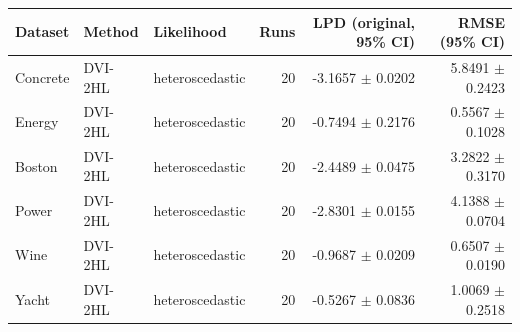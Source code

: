 \begin{tabular}{lllrrr}
\toprule
Dataset & Method & Likelihood & Runs & LPD (original, 95\% CI) & RMSE (95\% CI) \\
\midrule
Concrete & DVI-2HL & heteroscedastic & 20 & -3.1657 $\pm$ 0.0202 & 5.8491 $\pm$ 0.2423 \\
Energy & DVI-2HL & heteroscedastic & 20 & -0.7494 $\pm$ 0.2176 & 0.5567 $\pm$ 0.1028 \\
Boston & DVI-2HL & heteroscedastic & 20 & -2.4489 $\pm$ 0.0475 & 3.2822 $\pm$ 0.3170 \\
Power & DVI-2HL & heteroscedastic & 20 & -2.8301 $\pm$ 0.0155 & 4.1388 $\pm$ 0.0704 \\
Wine & DVI-2HL & heteroscedastic & 20 & -0.9687 $\pm$ 0.0209 & 0.6507 $\pm$ 0.0190 \\
Yacht & DVI-2HL & heteroscedastic & 20 & -0.5267 $\pm$ 0.0836 & 1.0069 $\pm$ 0.2518 \\
\bottomrule
\end{tabular}
